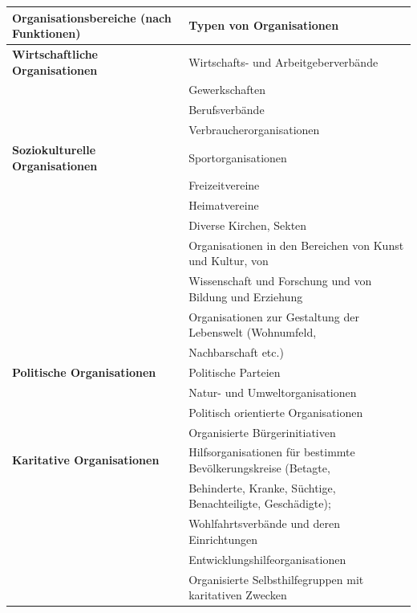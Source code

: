 \documentclass[
  letterpaper,
]{book}
\begin{document}
\begin{longtable}[]{@{}
  >{\raggedright\arraybackslash}p{}
  >{\raggedright\arraybackslash}p{}@{}}
\toprule\noalign{}
\begin{minipage}[b]{\linewidth}\raggedright
\textbf{Organisationsbereiche (nach Funktionen)}
\end{minipage} & \begin{minipage}[b]{\linewidth}\raggedright
\textbf{Typen von Organisationen}
\end{minipage} \\
\midrule\noalign{}
\endhead
\bottomrule\noalign{}
\endlastfoot
\textbf{Wirtschaftliche Organisationen} & Wirtschafts- und
Arbeitgeberverbände \\
& Gewerkschaften \\
& Berufsverbände \\
& Verbraucherorganisationen \\
\textbf{Soziokulturelle Organisationen} & Sportorganisationen \\
& Freizeitvereine \\
& Heimatvereine \\
& Diverse Kirchen, Sekten \\
& Organisationen in den Bereichen von Kunst und Kultur, von \\
& Wissenschaft und Forschung und von Bildung und Erziehung \\
& Organisationen zur Gestaltung der Lebenswelt (Wohnumfeld, \\
& Nachbarschaft etc.) \\
\textbf{Politische Organisationen} & Politische Parteien \\
& Natur- und Umweltorganisationen \\
& Politisch orientierte Organisationen \\
& Organisierte Bürgerinitiativen \\
\textbf{Karitative Organisationen} & Hilfsorganisationen für bestimmte
Bevölkerungskreise (Betagte, \\
& Behinderte, Kranke, Süchtige, Benachteiligte, Geschädigte); \\
& Wohlfahrtsverbände und deren Einrichtungen \\
& Entwicklungshilfeorganisationen \\
& Organisierte Selbsthilfegruppen mit karitativen Zwecken \\
\end{longtable}
\end{document}
